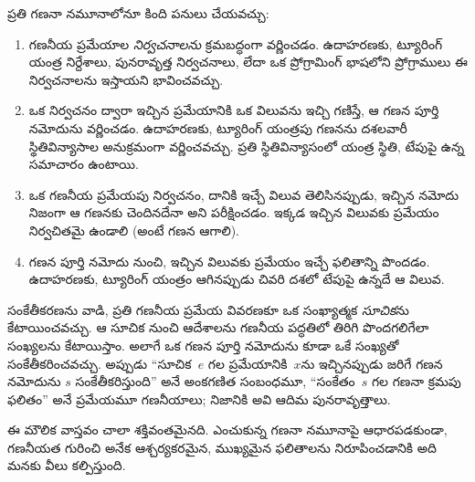 \documentclass[../../../include/open-logic-section]{subfiles}
\begin{document}

ప్రతి గణనా నమూనాలోనూ కింది పనులు చేయవచ్చు:
\begin{enumerate}
\item గణనీయ ప్రమేయాల \emph{నిర్వచనాలను} క్రమబద్ధంగా వర్ణించడం.
  ఉదాహరణకు, ట్యూరింగ్ యంత్ర నిర్దేశాలు, పునరావృత్త నిర్వచనాలు, లేదా
  ఒక ప్రోగ్రామింగ్ భాషలోని ప్రోగ్రాములు ఈ నిర్వచనాలను ఇస్తాయని
  భావించవచ్చు.
\item ఒక నిర్వచనం ద్వారా ఇచ్చిన ప్రమేయానికి ఒక విలువను ఇచ్చి గణిస్తే,
  ఆ గణన పూర్తి నమోదును వర్ణించడం. ఉదాహరణకు, ట్యూరింగ్
  యంత్రపు గణనను దశలవారీ స్థితివిన్యాసాల అనుక్రమంగా వర్ణించవచ్చు.
  ప్రతి స్థితివిన్యాసంలో యంత్ర స్థితి, టేపుపై ఉన్న సమాచారం ఉంటాయి.
\item ఒక గణనీయ ప్రమేయపు నిర్వచనం, దానికి ఇచ్చే విలువ తెలిసినప్పుడు,
  ఇచ్చిన నమోదు నిజంగా ఆ గణనకు చెందినదేనా అని పరీక్షించడం.
  ఇక్కడ ఇచ్చిన విలువకు ప్రమేయం నిర్వచితమై ఉండాలి (అంటే గణన ఆగాలి).
\item గణన పూర్తి నమోదు నుంచి, ఇచ్చిన విలువకు ప్రమేయం
  ఇచ్చే ఫలితాన్ని పొందడం. ఉదాహరణకు, ట్యూరింగ్ యంత్రం ఆగినప్పుడు
  చివరి దశలో టేపుపై ఉన్నదే ఆ విలువ.
\end{enumerate}

సంకేతీకరణను వాడి, ప్రతి గణనీయ ప్రమేయ వివరణకూ ఒక సంఖ్యాత్మక
\emph{సూచిక}ను కేటాయించవచ్చు. ఆ సూచిక నుంచి ఆదేశాలను గణనీయ పద్ధతిలో
తిరిగి పొందగలిగేలా సంఖ్యలను కేటాయిస్తాం. అలాగే ఒక గణన పూర్తి
నమోదును కూడా ఒకే సంఖ్యతో సంకేతీకరించవచ్చు. అప్పుడు ``సూచిక~$e$ గల
ప్రమేయానికి~$x$ను ఇచ్చినప్పుడు జరిగే గణన నమోదును $s$ సంకేతీకరిస్తుంది'' అనే
అంకగణిత సంబంధమూ, ``సంకేతం~$s$ గల గణనా క్రమపు ఫలితం'' అనే
ప్రమేయమూ గణనీయాలు; నిజానికి అవి ఆదిమ పునరావృత్తాలు.

ఈ మౌలిక వాస్తవం చాలా శక్తివంతమైనది. ఎంచుకున్న గణనా నమూనాపై ఆధారపడకుండా,
గణనీయత గురించి అనేక ఆశ్చర్యకరమైన, ముఖ్యమైన ఫలితాలను నిరూపించడానికి అది
మనకు వీలు కల్పిస్తుంది.
\end{document}
